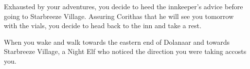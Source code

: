 Exhausted by your adventures, you decide to heed the innkeeper's advice before going to Starbreeze Village. Assuring Corithas that he will see you tomorrow with the vials, you decide to head back to the inn and take a rest.


When you wake and walk towards the eastern end of Dolanaar and towards Starbreeze Village, a Night Elf who noticed the direction you were taking accosts you.

